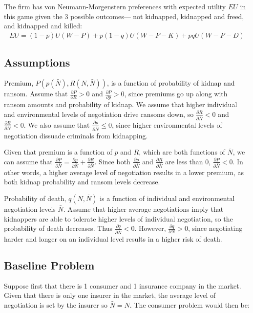 \documentclass[12pt]{article}
\begin{document}
The firm has von Neumann-Morgenstern preferences with expected utility $EU$ in this game given the 3 possible outcomes--- not kidnapped, kidnapped and freed, and kidnapped and killed:
\begin{align*}
EU = (1-p)U(W-P) + p(1-q)U(W-P-K) + pqU(W-P-D)
\end{align*}

\subsection{Assumptions}

Premium, $P(p(\bar{N}), R(N, \bar{N}))$, is a function of probability of kidnap and ransom. Assume that $\frac{\partial P}{\partial R} > 0$ and $\frac{\partial P}{\partial p} > 0$, since premiums go up along with ransom amounts and probability of kidnap. We assume that higher individual and environmental levels of negotiation drive ransoms down, so $\frac{\partial R}{\partial \bar{N}} < 0$ and $\frac{\partial R}{\partial N} < 0$. We also assume that $\frac{\partial p}{\partial \bar{N}} \leq 0$, since higher environmental levels of negotiation dissuade criminals from kidnapping. 

Given that premium is a function of $p$ and $R$, which are both functions of $\bar{N}$, we can assume that $\frac{\partial P}{\partial \bar{N}} = \frac{\partial p}{\partial \bar{N}} + \frac{\partial R}{\partial \bar{N}}$. Since both $\frac{\partial p}{\partial \bar{N}}$ and $\frac{\partial R}{\partial \bar{N}}$ are less than $0$, $\frac{\partial P}{\partial \bar{N}} < 0$. In other words, a higher average level of negotiation results in a lower premium, as both kidnap probability and ransom levels decrease.

Probability of death, $q(N, \bar{N})$ is a function of individual and environmental negotiation levels $\bar{N}$. Assume that higher average negotiations imply that kidnappers are able to tolerate higher levels of individual negotiation, so the probability of death decreases. Thus $\frac{\partial q}{\partial \bar{N}} < 0$. However, $\frac{\partial q}{\partial N} > 0$, since negotiating harder and longer on an individual level results in a higher risk of death.

\subsection{Baseline Problem}

Suppose first that there is 1 consumer and 1 insurance company in the market. Given that there is only one insurer in the market, the average level of negotiation is set by the insurer so $\bar{N} = N$. The consumer problem would then be:
\end{document}
